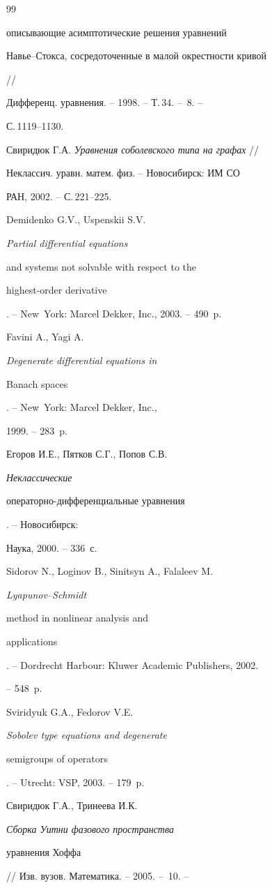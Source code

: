 \begin{thebibliography}{99}
{описывающие асимптотические решения уравнений


Навье--Стокса, сосредоточенные в малой окрестности кривой} // 


Дифференц. уравнения. -- 1998. -- Т.\,34. -- \No\,8. --


С.\,1119--1130.




Свиридюк Г.А. {\it Уравнения соболевского типа на графах} // 


Неклассич. уравн. матем. физ. -- Новосибирск: ИМ СО


РАН, 2002. -- С.\,221--225.




Demidenko G.V., Uspenskii S.V. {\it Partial differential equations 


and systems not solvable with respect to the


highest-order derivative}. -- New~York: Marcel Dekker, Inc., 2003. -- 490~p.




Favini A., Yagi A. {\it Degenerate differential equations in 


Banach spaces}. -- New~York: Marcel Dekker, Inc.,


1999. -- 283~p.




Егоров И.Е., Пятков С.Г., Попов С.В. {\it Неклассические 


операторно-дифференциальные уравнения}. -- Новосибирск:


Наука, 2000. -- 336~с.




Sidorov N., Loginov B., Sinitsyn A., Falaleev M. {\it Lyapunov--Schmidt 


method in nonlinear analysis and


applications}. -- Dordrecht Harbour: Kluwer Academic Publishers, 2002.


-- 548~p.




Sviridyuk G.A., Fedorov V.E. {\it Sobolev type equations and degenerate 


semigroups of operators}. -- Utrecht: VSP, 2003. -- 179~p.




Свиридюк Г.А., Тринеева И.К. {\em Сборка Уитни фазового пространства


уравнения Хоффа} // Изв. вузов. Математика. -- 2005. -- \No\,10. --



\end{thebibliography}
